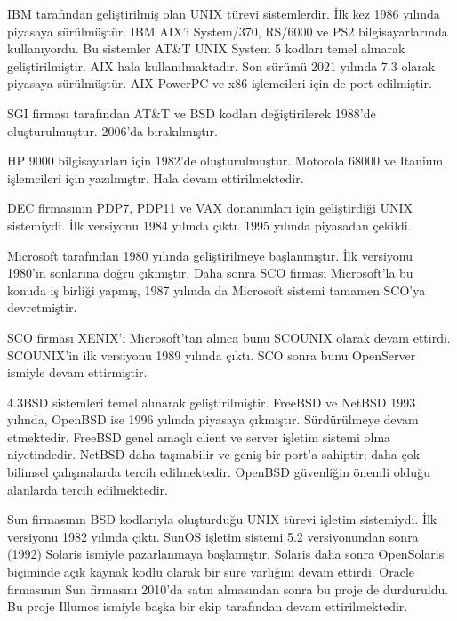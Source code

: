 \documentclass[a4paper,10pt,turkish]{sphinxmanual}
\begin{document}
\begin{description}
\sphinxAtStartPar
IBM tarafından geliştirilmiş olan UNIX türevi sistemlerdir. İlk kez 1986 yılında
piyasaya sürülmüştür. IBM AIX’i System/370, RS/6000 ve PS2 bilgisayarlarında
kullanıyordu. Bu sistemler AT\&T UNIX System 5 kodları temel alınarak geliştirilmiştir.
AIX hala kullanılmaktadır. Son sürümü 2021 yılında 7.3 olarak piyasaya sürülmüştür.
AIX PowerPC ve x86 işlemcileri için de port edilmiştir.

\sphinxAtStartPar
SGI firması tarafından AT\&T ve BSD kodları değiştirilerek 1988’de oluşturulmuştur.
2006’da bırakılmıştır.

\sphinxAtStartPar
HP 9000 bilgisayarları için 1982’de oluşturulmuştur. Motorola 68000 ve Itanium
işlemcileri için yazılmıştır. Hala devam ettirilmektedir.

\sphinxAtStartPar
DEC firmasının PDP\sphinxhyphen{}7, PDP\sphinxhyphen{}11 ve VAX donanımları için geliştirdiği UNIX sistemiydi.
İlk versiyonu 1984 yılında çıktı. 1995 yılında piyasadan çekildi.

\sphinxAtStartPar
Microsoft tarafından 1980 yılında geliştirilmeye başlanmıştır. İlk versiyonu 1980’in
sonlarına doğru çıkmıştır. Daha sonra SCO firması Microsoft’la bu konuda iş birliği
yapmış, 1987 yılında da Microsoft sistemi tamamen SCO’ya devretmiştir.

\sphinxAtStartPar
SCO firması XENIX’i Microsoft’tan alınca bunu SCO\sphinxhyphen{}UNIX olarak devam ettirdi. SCO\sphinxhyphen{}UNIX’in
ilk versiyonu 1989 yılında çıktı. SCO sonra bunu OpenServer ismiyle devam ettirmiştir.

\sphinxAtStartPar
4.3BSD sistemleri temel alınarak geliştirilmiştir. FreeBSD ve NetBSD 1993 yılında,
OpenBSD ise 1996 yılında piyasaya çıkmıştır. Sürdürülmeye devam etmektedir. FreeBSD
genel amaçlı client ve server işletim sistemi olma niyetindedir. NetBSD daha taşınabilir
ve geniş bir port’a sahiptir; daha çok bilimsel çalışmalarda tercih edilmektedir.
OpenBSD güvenliğin önemli olduğu alanlarda tercih edilmektedir.

\sphinxAtStartPar
Sun firmasının BSD kodlarıyla oluşturduğu UNIX türevi işletim sistemiydi. İlk versiyonu
1982 yılında çıktı. SunOS işletim sistemi 5.2 versiyonundan sonra (1992) Solaris ismiyle
pazarlanmaya başlamıştır. Solaris daha sonra OpenSolaris biçiminde açık kaynak kodlu
olarak bir süre varlığını devam ettirdi. Oracle firmasının Sun firmasını 2010’da satın
almasından sonra bu proje de durduruldu. Bu proje Illumos ismiyle başka bir ekip
tarafından devam ettirilmektedir.


\end{description}
\end{document}
